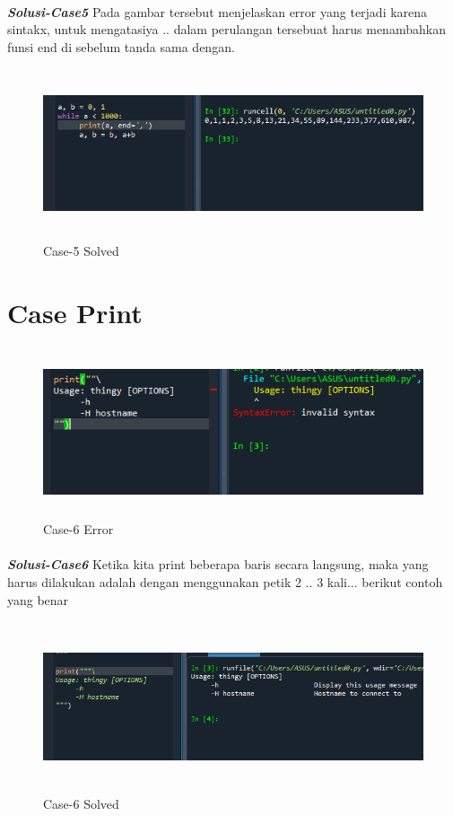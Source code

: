 \documentclass[12pt,a4paper]{article}
\begin{document}
\paragraph{}\textbf{\textit{Solusi-Case5}} {Pada gambar tersebut menjelaskan error yang terjadi karena sintakx, untuk mengatasiya .. dalam perulangan tersebuat harus menambahkan funsi end di sebelum tanda sama dengan.  }
\begin{figure}[ht]
    \centerline{\includegraphics[width=15cm,height=5cm]{image/case5-solved.png}}
    \renewcommand{\figurename}{Gambar}
    \caption{Case-5 Solved}
\end{figure}

\newpage
\section{Case Print}
\begin{figure}[ht]
    \centerline{\includegraphics[width=15cm,height=5cm]{image/case6.png}}
    \renewcommand{\figurename}{Gambar}
    \caption{Case-6 Error}
\end{figure}
\paragraph{}\textbf{\textit{Solusi-Case6}} {Ketika kita print beberapa baris secara langsung, maka yang harus dilakukan adalah dengan menggunakan petik 2 .. 3 kali... berikut contoh yang benar}
\begin{figure}[ht]
    \centerline{\includegraphics[width=15cm,height=5cm]{image/case6-solved.png}}
    \renewcommand{\figurename}{Gambar}
    \caption{Case-6 Solved}
\end{figure}
\end{document}
